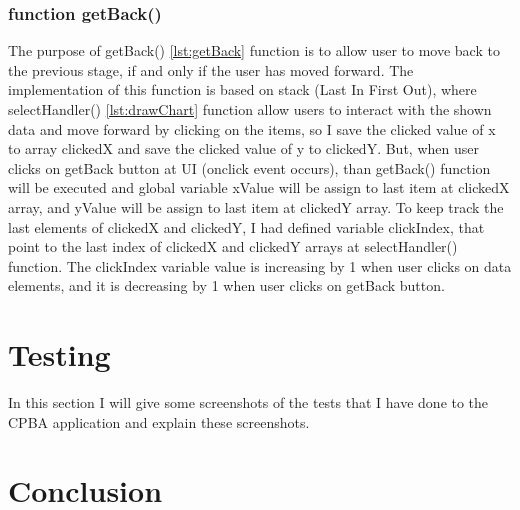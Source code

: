 \documentclass[11pt]{article}
\begin{document}
\subsubsection{function getBack()}
The purpose of getBack() \ref{lst:getBack} function is to allow user to move back to the previous stage, if and only if the user has moved forward. The implementation of this function is based on stack (Last In First Out), where selectHandler() \ref{lst:drawChart} function allow users to interact with the shown data and move forward by clicking on the items, so I save the clicked value of x to array clickedX and save the clicked value of y to clickedY. But, when user clicks on getBack button at UI (onclick event occurs), than getBack() function will be executed and global variable xValue will be assign to last item at clickedX array, and yValue will be assign to last item at clickedY array. To keep track the last elements of clickedX and clickedY, I had defined variable clickIndex, that point to the last index of clickedX and clickedY arrays at selectHandler() function. The clickIndex variable value is increasing by 1 when user clicks on data elements, and it is decreasing by 1 when user clicks on getBack button.

\section{Testing}
In this section I will give some screenshots of the tests that I have done to the CPBA application and explain these screenshots.

\section{Conclusion}

\newpage
\end{document}
